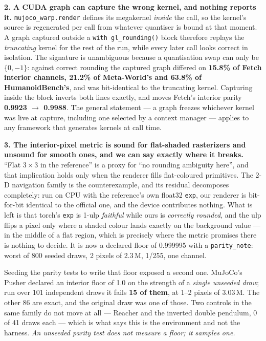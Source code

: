 \documentclass{article}
\begin{document}
\textbf{2. A CUDA graph can capture the wrong kernel, and nothing reports it.}
\texttt{mujoco\_warp.render} defines its megakernel \emph{inside} the call, so
the kernel's source is regenerated per call from whatever quantiser is bound at
that moment. A graph captured outside a \texttt{with gl\_rounding()} block
therefore replays the \emph{truncating} kernel for the rest of the run, while
every later call looks correct in isolation. The signature is unambiguous
because a quantisation swap can only be $\{0, -1\}$: against correct rounding
the captured graph differed on \textbf{15.8\% of Fetch interior channels,
21.2\% of Meta-World's and 63.8\% of HumanoidBench's}, and was bit-identical to
the truncating kernel. Capturing inside the block inverts both lines exactly,
and moves Fetch's interior parity \textbf{0.9923 $\to$ 0.9988}. The general
statement --- a graph freezes whichever kernel was live at capture, including
one selected by a context manager --- applies to any framework that generates
kernels at call time.

\textbf{3. The interior-pixel metric is sound for flat-shaded rasterizers and
unsound for smooth ones, and we can say exactly where it breaks.} ``Flat
$3\times3$ in the reference'' is a proxy for ``no rounding ambiguity here'',
and that implication holds only when the renderer fills flat-coloured
primitives. The 2-D navigation family is the counterexample, and its residual
decomposes completely: run on CPU with the reference's own float32
\texttt{exp}, our renderer is bit-for-bit identical to the official one, and
the device contributes nothing. What is left is that torch's \texttt{exp} is
1-ulp \emph{faithful} while ours is \emph{correctly rounded}, and the ulp flips
a pixel only where a shaded colour lands exactly on the background value --- in
the middle of a flat region, which is precisely where the metric promises there
is nothing to decide. It is now a declared floor of 0.999995 with a
\texttt{parity\_note}: worst of 800 seeded draws, 2 pixels of 2.3\,M, 1/255,
one channel.

Seeding the parity tests to write that floor exposed a second one. MuJoCo's
Pusher declared an interior floor of 1.0 on the strength of a \emph{single
unseeded draw}; run over 101 independent draws it fails \textbf{15 of them}, at
1--2 pixels of 3.03\,M. The other 86 are exact, and the original draw was one
of those. Two controls in the same family do not move at all --- Reacher and the
inverted double pendulum, 0 of 41 draws each --- which is what says this is the
environment and not the harness. \emph{An unseeded parity test does not measure
a floor; it samples one.}
\end{document}

